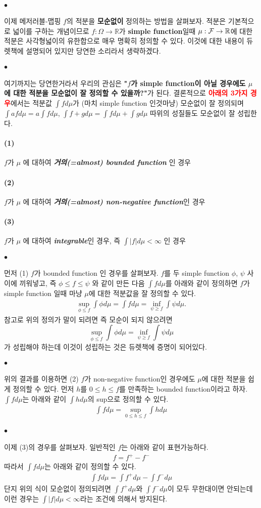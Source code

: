 \documentclass[12pt,oneside,english,a4paper]{article}
\def\ck{\paragraph{\Large$\bullet$}\Large}
\def\one{\paragraph{\Large(1)}\Large}
\def\two{\paragraph{\Large(2)}\Large}
\def\three{\paragraph{\Large(3)}\Large}
\begin{document}
\ck 이제 메저러블-맵핑 $f$의 적분을 \textbf{모순없이} 정의하는 방법을 살펴보자. 적분은 기본적으로 넓이를 구하는 개념이므로 $f:\Omega \rightarrow \mathbb{R}$가 \textbf{simple function}일때  $\mu:{\cal F} \rightarrow \mathbb{R}$에 대한 적분은 사각형넓이의 유한합으로 매우 명확히 정의할 수 있다. 이것에 대한 내용이 듀렛책에 설명되어 있지만 당연한 소리라서 생략하겠다. 

\ck 여기까지는 당연한거라서 우리의 관심은 \textbf{"$f$가 simple function이 아닐 경우에도 $\mu$에 대한 적분을 모순없이 잘 정의할 수 있을까?"}가 된다. 결론적으로 
\textbf{\textcolor{red}{아래의 3가지 경우}}에서는 적분값 $\int f d \mu$가 (마치 simple function 인것마냥) 모순없이 잘 정의되며 $\int af d\mu = a \int f d \mu$, $\int f+g d\mu = \int f d \mu + \int g d \mu$ 따위의 성질들도 모순없이 잘 성립한다. 

\one  $f$가 $\mu$ 에 대하여 \emph{\textbf{거의(=almost) bounded function}} 인 경우 

\two  $f$가 $\mu$ 에 대하여 \emph{\textbf{거의(=almost) non-negative function}}인 경우 

\three $f$가 $\mu$ 에 대하여 \emph{\textbf{integrable}}인 경우, 즉 $\int |f| d\mu < \infty$ 인 경우

\ck 먼저 (1) $f$가 bounded function 인 경우를 살펴보자. $f$를 두 simple function $\phi$, $\psi$ 사이에 끼워넣고, 즉 $\phi \leq f \leq \psi$ 와 같이 만든 다음 $\int f d\mu $를 아래와 같이 정의하면 $f$가 simple function 일때 마냥 $\mu$에 대한 적분값을 잘 정의할 수 있다. 
\begin{align*}
\sup_{\phi \leq f} \int \phi d\mu = \int f d\mu = \inf_{\psi \geq f} \int \psi d\mu. 
\end{align*}
참고로 위의 정의가 말이 되려면 즉 모순이 되지 않으려면 
\[
\sup_{\phi \leq f} \int \phi d\mu = \inf_{\psi \geq f} \int \psi d\mu
\]
가 성립해야 하는데 이것이 성립하는 것은 듀렛책에 증명이 되어있다. 

\ck 위의 결과를 이용하면 (2) $f$가 non-negative function인 경우에도 $\mu$에 대한 적분을 쉽게 정의할 수 있다. 먼저 $h$를 $0\leq h \leq f$를 만족하는 bounded function이라고 하자. $\int f d\mu$는 아래와 같이 $\int h d \mu$의 sup으로 정의할 수 있다. 
\begin{align*}
\int f d\mu = \sup_{0\leq h \leq f} \int h d \mu
\end{align*}

\ck 이제 (3)의 경우를 살펴보자. 일반적인 $f$는 아래와 같이 표현가능하다. 
\begin{align*}
f=f^+ -f^-
\end{align*}
따라서 $\int f d\mu$는 아래와 같이 정의할 수 있다. 
\begin{align*}
\int f d\mu = \int f^+ d\mu - \int f^- d\mu
\end{align*}
단지 위의 식이 모순없이 정의되려면 $\int f^+ d\mu$와 $\int f^- d\mu$이 모두 무한대이면 안되는데 이런 경우는 $\int |f| d\mu < \infty$라는 조건에 의해서 방지된다. 
\end{document}
